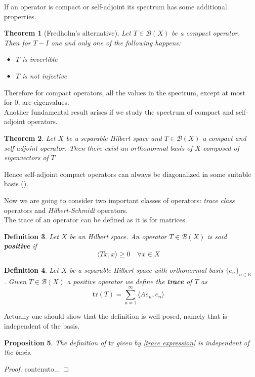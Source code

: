 \documentclass[corpo=11pt, stile=classica, tipotesi=custom,
greek, evenboxes, english]{toptesi}
\numberwithin{equation}{chapter}
\newtheorem{teo}{Theorem}[chapter] %
\newtheorem{defi}[teo]{Definition}
\newtheorem{prop}[teo]{Proposition}
\newcommand{\N}{\mathbb{N}} %
\newcommand{\B}{\mathscr{B}} %
\begin{document}
If an operator is compact or self-adjoint its spectrum has some additional properties.
\begin{teo}[Fredholm's alternative]\label{Fredholm alternative}
	Let $T \in \B(X)$ be a compact operator. Then for $T-I$ one and only one of the following happens:
	\begin{itemize}
		\item $T$ is invertible
		\item $T$ is not injective
	\end{itemize}
\end{teo}
Therefore for compact operators, all the values in the spectrum, except at most for 0, are eigenvalues.\\
Another fundamental result arises if we study the spectrum of compact and self-adjoint operators.
\begin{teo}\label{self-adjoint compact operators are diagonalizable}
	Let $X$ be a separable Hilbert space and $T \in \B(X)$ a compact and self-adjoint operator. Then there exist an orthonormal basis of $X$ composed of eigenvectors of $T$
\end{teo}
Hence self-adjoint compact operators can always be diagonalized in some suitable basis (\cite{brezis}).

Now we are going to consider two important classes of operators: \emph{trace class} operators and \emph{Hilbert-Schmidt} operators.\\
The trace of an operator can be defined as it is for matrices.
\begin{defi}\label{positive operator}
	Let $X$ be an Hilbert space. An operator $T \in \B(X)$ is said \textbf{positive} if
	\begin{equation*}
		\langle T x, x \rangle \geq 0 \quad \forall x \in X
	\end{equation*}
\end{defi}
\begin{defi}\label{trace def}
	Let $X$ be a separable Hilbert space with orthonormal basis $\{e_n\}_{n \in \N}$. Given $T \in \B(X)$ a positive operator we define the \textbf{trace} of $T$ as
	\begin{equation*}\label{trace expression}
		\mathrm{tr}(T) = \sum_{n=1}^{\infty} \langle A e_n, e_n \rangle
	\end{equation*}
\end{defi}
Actually one should show that the definition is well posed, namely that is independent of the basis.
\begin{prop}\label{trace is well-deefined}
	The definition of $\mathrm{tr}$ given by \eqref{trace expression} is independent of the basis.
\end{prop}
\begin{proof}
	contenuto...
\end{proof}
\end{document}
